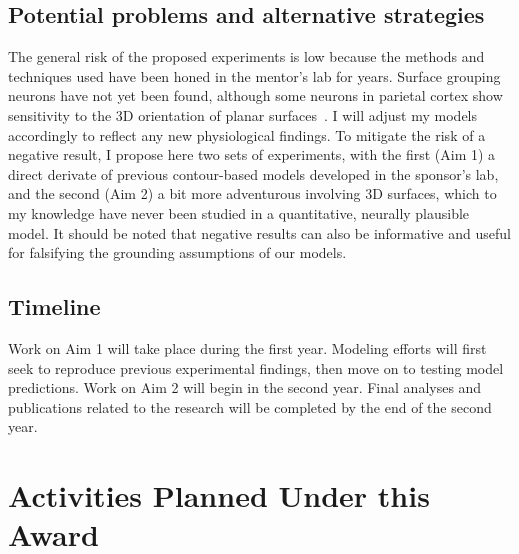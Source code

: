 \documentclass[11pt,notitlepage]{article}
\begin{document}
\subsection{Potential problems and alternative strategies}
The general risk of the proposed experiments is low because the
methods and techniques used have been honed in the mentor's lab for
years. Surface grouping neurons have not yet been found, although some
neurons in parietal cortex show sensitivity to the 3D orientation of
planar surfaces~\citep{Rosenberg_etal13}. I will adjust my models
accordingly to reflect any new physiological findings. To mitigate the
risk of a negative result,
 I propose here two sets of experiments,
with the first (Aim 1) a direct derivate of previous contour-based
models developed in the sponsor's lab, and the second (Aim 2) a bit
more adventurous involving 3D surfaces, which to my knowledge have
never been studied in a quantitative, neurally plausible model. It should be noted that negative results can also be informative and useful for falsifying the grounding assumptions of our models.
 
\subsection{Timeline} Work on Aim 1 will take place during the first year. Modeling efforts will first seek to reproduce previous experimental findings, then move on to testing model predictions. Work on Aim 2 will begin in the second year.
Final analyses and publications related to the research will be completed by the end of the second year.

\clearpage

\section*{Activities Planned Under this Award}
\end{document}
